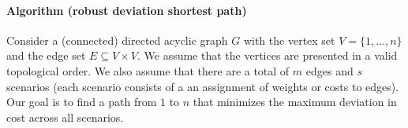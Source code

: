 \documentclass{article}
\begin{document}
\long{} %

\paragraph{Algorithm (robust deviation shortest path)}

Consider a (connected) directed acyclic graph $G$ with the vertex set $V = \{1, \dots, n\}$ and the edge set $E \subseteq V \times V$. We assume that the vertices are presented in a valid topological order. We also assume that there are a total of $m$ edges and $s$ scenarios (each scenario consists of a an assignment of weights or costs to edges). Our goal is to find a path from $1$ to $n$ that minimizes the maximum deviation in cost across all scenarios.\cite{some_refs}
\end{document}
